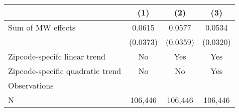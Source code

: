 {
\def\sym#1{\ifmmode^{#1}\else\(^{#1}\)\fi}
\begin{tabular}{l*{3}{c}}
\hline\hline
          &\multicolumn{1}{c}{(1)}         &\multicolumn{1}{c}{(2)}         &\multicolumn{1}{c}{(3)}         \\
\hline
Sum of MW effects&   0.0615         &   0.0577         &   0.0534         \\
          & (0.0373)         & (0.0359)         & (0.0320)         \\
\hline
Zipcode-specifc linear trend&       No         &      Yes         &      Yes         \\
Zipcode-specific quadratic trend&       No         &       No         &      Yes         \\
Observations&                  &                  &                  \\
N         &  106,446         &  106,446         &  106,446         \\
\hline\hline
\end{tabular}
}
